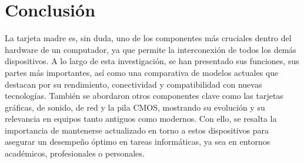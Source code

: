 \chapter{Conclusión}

La tarjeta madre es, sin duda, uno de los componentes más cruciales dentro del hardware de un computador, ya que permite la interconexión de todos los demás dispositivos. A lo largo de esta investigación, se han presentado sus funciones, sus partes más importantes, así como una comparativa de modelos actuales que destacan por su rendimiento, conectividad y compatibilidad con nuevas tecnologías. También se abordaron otros componentes clave como las tarjetas gráficas, de sonido, de red y la pila CMOS, mostrando su evolución y su relevancia en equipos tanto antiguos como modernos. Con ello, se resalta la importancia de mantenerse actualizado en torno a estos dispositivos para asegurar un desempeño óptimo en tareas informáticas, ya sea en entornos académicos, profesionales o personales.
